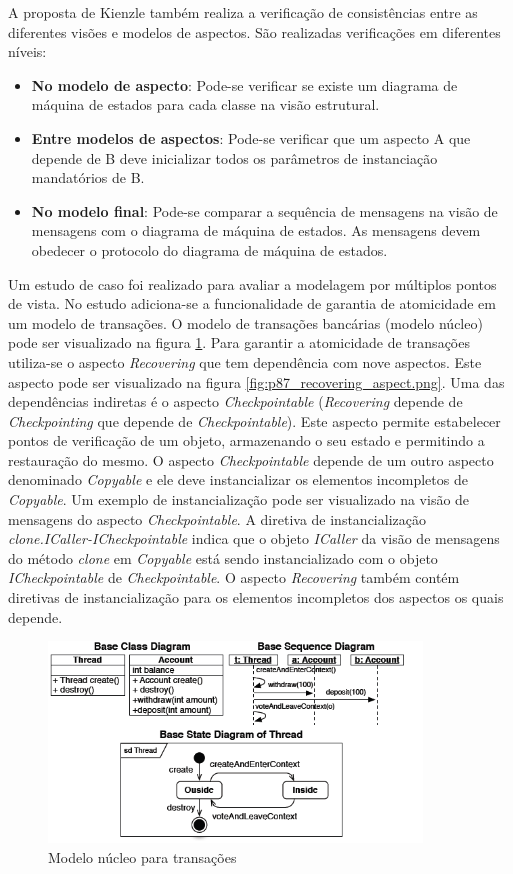 A proposta de Kienzle também realiza a verificação de consistências entre as diferentes visões e modelos de aspectos. São realizadas verificações em
diferentes níveis:

\begin{itemize}
  \item \textbf{No modelo de aspecto}: Pode-se verificar se existe um diagrama de máquina de estados para cada classe na visão estrutural.
  \item \textbf{Entre modelos de aspectos}: Pode-se verificar que um aspecto A que depende de B deve inicializar todos os parâmetros de instanciação
  mandatórios de B.
  \item \textbf{No modelo final}: Pode-se comparar a sequência de mensagens na visão de mensagens com o diagrama de máquina de estados. As mensagens
  devem obedecer o protocolo do diagrama de máquina de estados.
\end{itemize}

Um estudo de caso foi realizado para avaliar a modelagem por múltiplos pontos de vista. No estudo adiciona-se a funcionalidade de garantia de
atomicidade em um modelo de transações. O modelo de transações bancárias (modelo núcleo) pode ser visualizado na figura \ref{fig:p87_base_model}. Para
garantir a atomicidade de transações utiliza-se o aspecto \textit{Recovering} que tem dependência com nove aspectos. Este aspecto pode ser visualizado 
na figura \ref{fig:p87_recovering_aspect.png}. Uma das dependências indiretas é o aspecto \textit{Checkpointable} (\textit{Recovering} depende de
\textit{Checkpointing} que depende de \textit{Checkpointable}). Este aspecto permite estabelecer pontos de verificação de um objeto, armazenando o seu estado e permitindo a restauração do mesmo. O aspecto \textit{Checkpointable} depende 
de um outro aspecto denominado \textit{Copyable} e ele deve instancializar os elementos incompletos de \textit{Copyable}. Um exemplo de
instancialização pode ser visualizado na visão de mensagens do aspecto \textit{Checkpointable}. A diretiva de instancialização \textit{clone.ICaller-ICheckpointable} 
indica que o objeto \textit{ICaller} da visão de mensagens do método \textit{clone} em \textit{Copyable} está sendo instancializado com o objeto
\textit{ICheckpointable} de \textit{Checkpointable}. O aspecto \textit{Recovering} também contém diretivas de instancialização para os elementos 
incompletos dos aspectos os quais depende.

\begin{figure}[!hb]
	\centering
	\includegraphics[width=375px]{img/p87_base_model.png}
	\caption{Modelo núcleo para transações}\label{fig:p87_base_model}
\end{figure}

